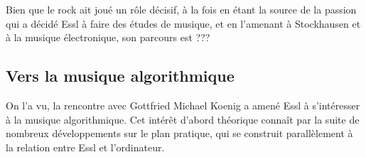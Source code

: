 \documentclass[a4paper,12pt]{article}
\begin{document}
Bien que le rock ait joué un rôle décisif, à la fois en étant la source de la passion qui a décidé Essl à faire des études de musique, et en l'amenant à Stockhausen et à la musique électronique, son parcours est ???


\subsection{Vers la musique algorithmique}
\label{parcoursalgo}

On l'a vu, la rencontre avec Gottfried Michael Koenig a amené Essl à s'intéresser à la musique algorithmique. Cet intérêt d'abord théorique connaît par la suite de nombreux développements sur le plan pratique, qui se construit parallèlement à la relation entre Essl et l'ordinateur.
\end{document}
